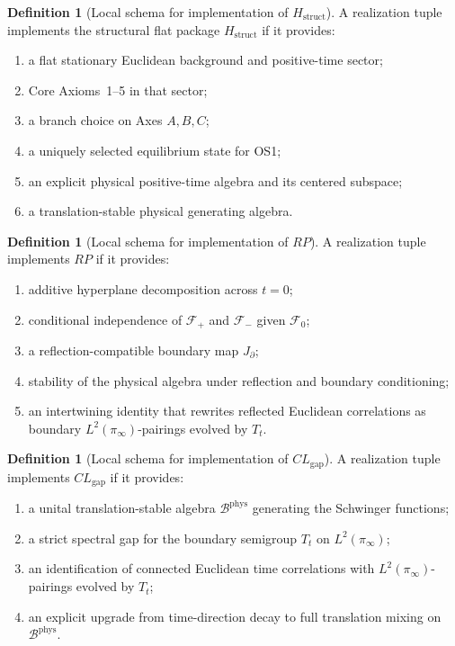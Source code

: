 \documentclass[11pt]{article}
\theoremstyle{definition}
\newtheorem{definition}[theorem]{Definition}
\theoremstyle{remark}
\newcommand{\mcB}{\mathcal B}
\begin{document}
\begin{definition}[Local schema for implementation of \(H_{\mathrm{struct}}\)]
\label{def:api-hstruct-schema}
A realization tuple implements the structural flat package
\(H_{\mathrm{struct}}\) if it provides:
\begin{enumerate}[label=\textnormal{(H\arabic*)},leftmargin=1.5em]
\item a flat stationary Euclidean background and positive-time sector;
\item Core Axioms~1--5 in that sector;
\item a branch choice on Axes \(A,B,C\);
\item a uniquely selected equilibrium state for OS1;
\item an explicit physical positive-time algebra and its centered subspace;
\item a translation-stable physical generating algebra.
\end{enumerate}
\end{definition}

\begin{definition}[Local schema for implementation of \(RP\)]
\label{def:api-rp-schema}
A realization tuple implements \(RP\) if it provides:
\begin{enumerate}[label=\textnormal{(RP\arabic*)},leftmargin=1.5em]
\item additive hyperplane decomposition across \(t=0\);
\item conditional independence of \(\mathcal F_+\) and \(\mathcal F_-\) given
\(\mathcal F_0\);
\item a reflection-compatible boundary map \(J_{\partial}\);
\item stability of the physical algebra under reflection and boundary
conditioning;
\item an intertwining identity that rewrites reflected Euclidean correlations as
boundary \(L^2(\pi_\infty)\)-pairings evolved by \(T_t\).
\end{enumerate}
\end{definition}

\begin{definition}[Local schema for implementation of \(CL_{\mathrm{gap}}\)]
\label{def:api-cl-schema}
A realization tuple implements \(CL_{\mathrm{gap}}\) if it provides:
\begin{enumerate}[label=\textnormal{(CL\arabic*)},leftmargin=1.5em]
\item a unital translation-stable algebra \(\mcB^{\mathrm{phys}}\) generating
the Schwinger functions;
\item a strict spectral gap for the boundary semigroup \(T_t\) on
\(L^2(\pi_\infty)\);
\item an identification of connected Euclidean time correlations with
\(L^2(\pi_\infty)\)-pairings evolved by \(T_t\);
\item an explicit upgrade from time-direction decay to full translation mixing
on \(\mcB^{\mathrm{phys}}\).
\end{enumerate}
\end{definition}
\end{document}
